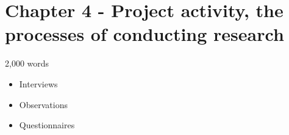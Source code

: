 \section{Chapter 4 - Project activity, the processes of conducting research}
2,000 words 

\begin{itemize}
\item Interviews
\item Observations
\item Questionnaires 
\end{itemize}